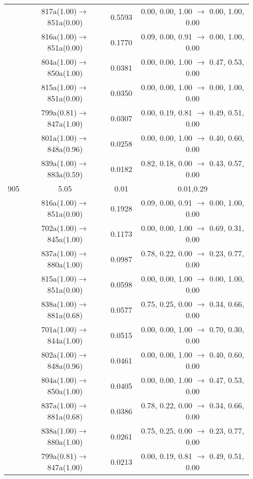 \documentclass[10pt,a4paper]{article}
\begin{document}
\begin{longtable}{c|c|c|c}
  	& 817a(1.00)$\rightarrow$851a(0.00) &	 0.5593 &	 0.00, 0.00, 1.00 $\rightarrow$ 0.00, 1.00, 0.00 \\ 
 	& 816a(1.00)$\rightarrow$851a(0.00) &	 0.1770 &	 0.09, 0.00, 0.91 $\rightarrow$ 0.00, 1.00, 0.00 \\ 
 	& 804a(1.00)$\rightarrow$850a(1.00) &	 0.0381 &	 0.00, 0.00, 1.00 $\rightarrow$ 0.47, 0.53, 0.00 \\ 
 	& 815a(1.00)$\rightarrow$851a(0.00) &	 0.0350 &	 0.00, 0.00, 1.00 $\rightarrow$ 0.00, 1.00, 0.00 \\ 
 	& 799a(0.81)$\rightarrow$847a(1.00) &	 0.0307 &	 0.00, 0.19, 0.81 $\rightarrow$ 0.49, 0.51, 0.00 \\ 
 	& 801a(1.00)$\rightarrow$848a(0.96) &	 0.0258 &	 0.00, 0.00, 1.00 $\rightarrow$ 0.40, 0.60, 0.00 \\ 
 	& 839a(1.00)$\rightarrow$883a(0.59) &	 0.0182 &	 0.82, 0.18, 0.00 $\rightarrow$ 0.43, 0.57, 0.00 \\ 
 \hline905 &	 5.05 &	 0.01 &	 0.01,0.29 \\ 
  	& 816a(1.00)$\rightarrow$851a(0.00) &	 0.1928 &	 0.09, 0.00, 0.91 $\rightarrow$ 0.00, 1.00, 0.00 \\ 
 	& 702a(1.00)$\rightarrow$845a(1.00) &	 0.1173 &	 0.00, 0.00, 1.00 $\rightarrow$ 0.69, 0.31, 0.00 \\ 
 	& 837a(1.00)$\rightarrow$880a(1.00) &	 0.0987 &	 0.78, 0.22, 0.00 $\rightarrow$ 0.23, 0.77, 0.00 \\ 
 	& 815a(1.00)$\rightarrow$851a(0.00) &	 0.0598 &	 0.00, 0.00, 1.00 $\rightarrow$ 0.00, 1.00, 0.00 \\ 
 	& 838a(1.00)$\rightarrow$881a(0.68) &	 0.0577 &	 0.75, 0.25, 0.00 $\rightarrow$ 0.34, 0.66, 0.00 \\ 
 	& 701a(1.00)$\rightarrow$844a(1.00) &	 0.0515 &	 0.00, 0.00, 1.00 $\rightarrow$ 0.70, 0.30, 0.00 \\ 
 	& 802a(1.00)$\rightarrow$848a(0.96) &	 0.0461 &	 0.00, 0.00, 1.00 $\rightarrow$ 0.40, 0.60, 0.00 \\ 
 	& 804a(1.00)$\rightarrow$850a(1.00) &	 0.0405 &	 0.00, 0.00, 1.00 $\rightarrow$ 0.47, 0.53, 0.00 \\ 
 	& 837a(1.00)$\rightarrow$881a(0.68) &	 0.0386 &	 0.78, 0.22, 0.00 $\rightarrow$ 0.34, 0.66, 0.00 \\ 
 	& 838a(1.00)$\rightarrow$880a(1.00) &	 0.0261 &	 0.75, 0.25, 0.00 $\rightarrow$ 0.23, 0.77, 0.00 \\ 
 	& 799a(0.81)$\rightarrow$847a(1.00) &	 0.0213 &	 0.00, 0.19, 0.81 $\rightarrow$ 0.49, 0.51, 0.00 \\ 

\end{longtable}
\end{document}
